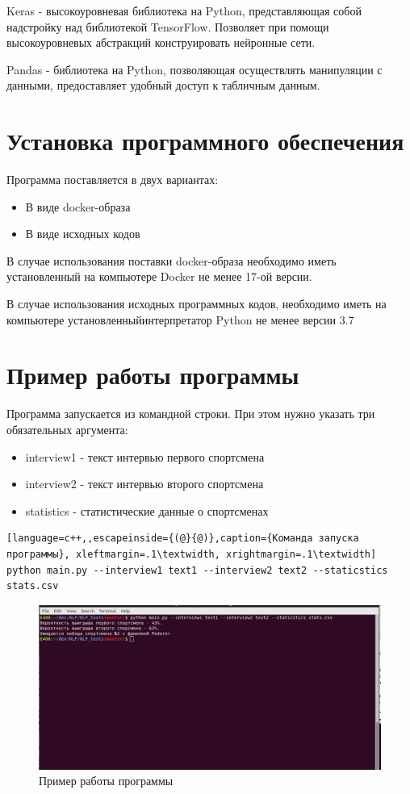 Keras - высокоуровневая библиотека на Python, представляющая собой надстройку над библиотекой TensorFlow. Позволяет при помощи высокоуровневых абстракций конструировать нейронные сети.

Pandas - библиотека на Python, позволяющая осуществлять манипуляции с данными, предоставляет удобный доступ к табличным данным.
\section{Установка программного обеспечения}
Программа поставляется в двух вариантах:
\begin{itemize}
	\item В виде docker-образа
	\item В виде исходных кодов
\end{itemize}
В случае использования поставки docker-образа необходимо иметь установленный на компьютере Docker не менее 17-ой версии.

В случае использования исходных программных кодов, необходимо иметь на компьютере установленныйинтерпретатор Python не менее версии 3.7


\section{Пример работы программы}
Программа запускается из командной строки. При этом нужно указать три обязательных аргумента:
\begin{itemize}
	\item interview1 - текст интервью первого спортсмена
	\item interview2 - текст интервью второго спортсмена
	\item statistics - статистические данные о спортсменах
\end{itemize}
\bigskip
\bigskip
\bigskip
\bigskip
\bigskip
\bigskip
\bigskip
\begin{lstlisting}[language=c++,,escapeinside={(@}{@)},caption={Команда запуска программы}, xleftmargin=.1\textwidth, xrightmargin=.1\textwidth] 
python main.py --interview1 text1 --interview2 text2 --staticstics stats.csv
\end{lstlisting}
\begin{figure}[]
	\centering
	\includegraphics[scale=0.5]{master_img/sample_program.png}
	\caption{Пример работы программы}
	\label{fig10}
\end{figure}